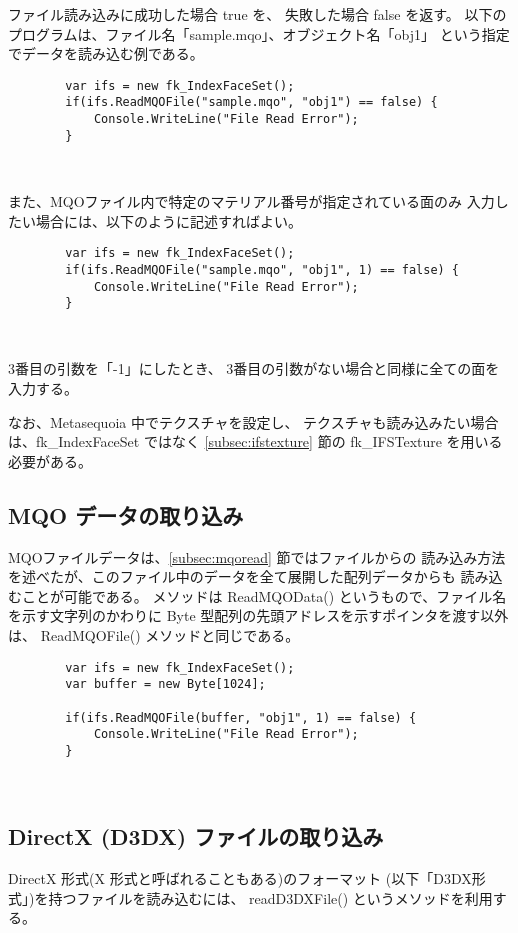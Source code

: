 ファイル読み込みに成功した場合 true を、
失敗した場合 false を返す。
以下のプログラムは、ファイル名「sample.mqo」、オブジェクト名「obj1」
という指定でデータを読み込む例である。
\\
\begin{screen}
\begin{verbatim}
        var ifs = new fk_IndexFaceSet();
        if(ifs.ReadMQOFile("sample.mqo", "obj1") == false) {
            Console.WriteLine("File Read Error");
        }
\end{verbatim}
\end{screen} ~

また、MQOファイル内で特定のマテリアル番号が指定されている面のみ
入力したい場合には、以下のように記述すればよい。
\begin{screen}
\begin{verbatim}
        var ifs = new fk_IndexFaceSet();
        if(ifs.ReadMQOFile("sample.mqo", "obj1", 1) == false) {
            Console.WriteLine("File Read Error");
        }
\end{verbatim}
\end{screen} ~

3番目の引数を「-1」にしたとき、
3番目の引数がない場合と同様に全ての面を入力する。

なお、Metasequoia 中でテクスチャを設定し、
テクスチャも読み込みたい場合は、fk\_IndexFaceSet ではなく
\ref{subsec:ifstexture} 節の fk\_IFSTexture を用いる必要がある。

\subsection{MQO データの取り込み} \label{subsec:mqodata}
MQOファイルデータは、\ref{subsec:mqoread} 節ではファイルからの
読み込み方法を述べたが、このファイル中のデータを全て展開した配列データからも
読み込むことが可能である。
メソッドは ReadMQOData() というもので、ファイル名を示す文字列のかわりに
Byte 型配列の先頭アドレスを示すポインタを渡す以外は、
ReadMQOFile() メソッドと同じである。
\begin{screen}
\begin{verbatim}
        var ifs = new fk_IndexFaceSet();
        var buffer = new Byte[1024];

        if(ifs.ReadMQOFile(buffer, "obj1", 1) == false) {
            Console.WriteLine("File Read Error");
        }
\end{verbatim}
\end{screen} ~

\subsection{DirectX (D3DX) ファイルの取り込み} \label{subsec:d3dxread}
DirectX 形式(X 形式と呼ばれることもある)のフォーマット
(以下「D3DX形式」)を持つファイルを読み込むには、
readD3DXFile() というメソッドを利用する。

